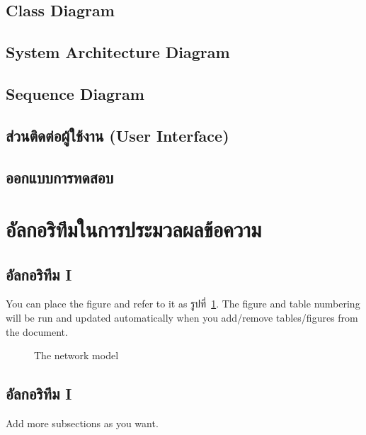\documentclass[12pt,oneside,openright,a4paper]{cpe-thai-project}
\begin{document}
\subsection{Class Diagram}
\subsection{System Architecture Diagram}
\subsection{Sequence Diagram}
\subsection{ส่วนติดต่อผู้ใช้งาน (User Interface)}
\subsection{ออกแบบการทดสอบ}
\section{อัลกอริทึมในการประมวลผลข้อความ}
\subsection{อัลกอริทึม I}

You can place the figure and refer to it as รูปที่~\ref{fig:model2}.
The figure and table numbering will be run and updated automatically when you add/remove tables/figures from the document.

\begin{figure}[!h]\centering
\setlength{\fboxrule}{0.2mm} %
\setlength{\fboxsep}{1cm}
\caption{The network model}\label{fig:model2}
\end{figure}

 
\subsection{อัลกอริทึม I}
Add more subsections as you want.
\end{document}
